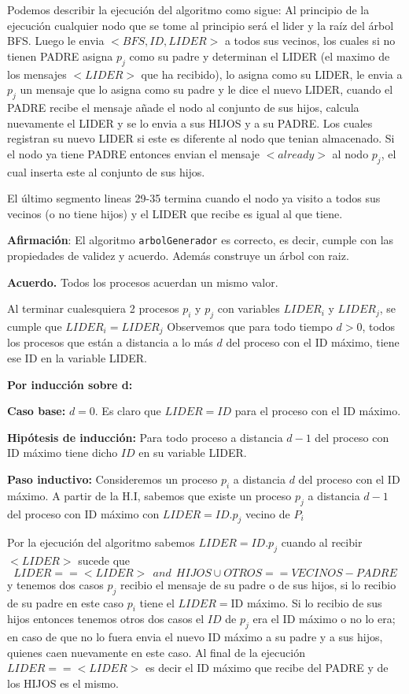 Podemos describir la ejecución del algoritmo como sigue:
Al principio de la ejecución cualquier nodo que se tome al principio será el lider y la raíz del árbol BFS. Luego le envia $<BFS,ID,LIDER>$ a todos sus vecinos, los cuales si no tienen PADRE asigna $p_j$ como su padre y determinan el LIDER (el maximo de los mensajes $<LIDER>$ que ha recibido), lo asigna como su LIDER, le envia a $p_j$ un mensaje que lo asigna como su padre y le dice el nuevo LIDER, cuando el PADRE recibe el mensaje añade el nodo al conjunto de sus hijos, calcula nuevamente el LIDER y se lo envia a sus HIJOS y a su PADRE. Los cuales registran su nuevo LIDER si este es diferente al nodo que tenian almacenado. Si el nodo ya tiene PADRE entonces envian el mensaje $<already>$ al nodo $p_j$, el cual inserta este al conjunto de sus hijos.

El último segmento lineas 29-35 termina cuando el nodo ya visito a todos sus vecinos (o no tiene hijos) y el LIDER que recibe es igual al que tiene.

\textbf{Afirmación}: El algoritmo {\tt arbolGenerador} es correcto, es decir, cumple con las propiedades de validez y acuerdo. Además construye un árbol con raiz.

\textbf{Acuerdo.} Todos los procesos acuerdan un mismo valor.

Al terminar cualesquiera 2 procesos $p_i$ y $p_j$ con variables $LIDER_i$ y $LIDER_j$, se cumple que $LIDER_i=LIDER_j$ Observemos que para todo tiempo $d>0$, todos los procesos que están a distancia a lo más $d$ del proceso con el ID máximo, tiene ese ID en la variable LIDER.

\textbf{Por inducción sobre d:}

\textbf{Caso base:} $d=0$. Es claro que $LIDER=ID$ para el proceso con el ID máximo.

\textbf{Hipótesis de inducción:} Para todo proceso a distancia $d-1$ del proceso con ID máximo tiene dicho $ID$ en su variable LIDER.

\textbf{Paso inductivo:}
Consideremos un proceso $p_i$ a distancia $d$ del proceso con el ID máximo. A partir de la H.I, sabemos que existe un proceso $p_j$ a distancia $d-1$ del proceso con ID máximo con $LIDER = ID.p_j$ vecino de $P_i$

Por la ejecución del algoritmo sabemos $LIDER = ID.p_j$ cuando al recibir $<LIDER>$ sucede que 
$$LIDER == <LIDER> \ \ and \ \ HIJOS \cup OTROS == VECINOS-PADRE$$ 
y tenemos dos casos $p_j$ recibio el mensaje de su padre o de sus hijos, si lo recibio de su padre en este caso $p_i$ tiene el $LIDER=$ID máximo. Si lo recibio de sus hijos entonces tenemos otros dos casos el $ID$ de $p_j$ era el ID máximo o no lo era; en caso de que no lo fuera envia el nuevo ID máximo a su padre y a sus hijos, quienes caen nuevamente en este caso. Al final de la ejecución $LIDER == <LIDER>$ es decir el ID máximo que recibe del PADRE y de los HIJOS es el mismo.


